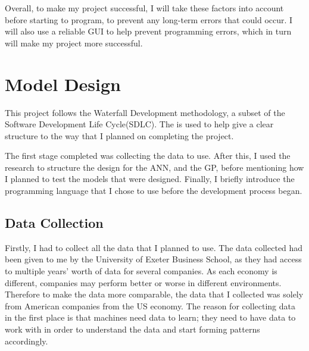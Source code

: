 \documentclass[11pt]{article}
\begin{document}
Overall, to make my project successful, I will take these factors into account before starting to program, to prevent any long-term errors that could occur. I will also use a reliable GUI to help prevent programming errors, which in turn will make my project more successful. 
\section{Model Design}\label{sec:design}
This project follows the Waterfall Development methodology, a subset of the Software Development Life Cycle(SDLC). The is used to help give a clear structure to the way that I planned on completing the project. 

The first stage completed was collecting the data to use. After this, I used the research to structure the design for the ANN, and the GP, before mentioning how I planned to test the models that were designed. Finally, I briefly introduce the programming language that I chose to use before the development process began.
\subsection{Data Collection}\label{subsec:dataColl}
Firstly, I had to collect all the data that I planned to use. The data collected had been given to me by the University of Exeter Business School, as they had access to multiple years' worth of data for several companies. As each economy is different, companies may perform better or worse in different environments. Therefore to make the data more comparable, the data that I collected was solely from American companies from the US economy. The reason for collecting data in the first place is that machines need data to learn; they need to have data to work with in order to understand the data and start forming patterns accordingly.
\end{document}
